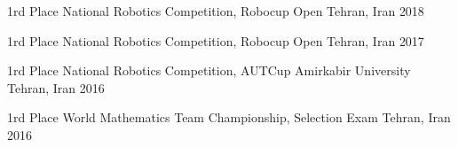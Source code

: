 \begin{cvhonors}





\cvhonor
{1rd Place} %
{National Robotics Competition, Robocup Open} %
{Tehran, Iran} %
{2018} %


\cvhonor
{1rd Place} %
{National Robotics Competition, Robocup Open} %
{Tehran, Iran} %
{2017} %


\cvhonor
{1rd Place} %
{National Robotics Competition, AUTCup Amirkabir University} %
{Tehran, Iran} %
{2016} %


\cvhonor
{1rd Place} %
{World Mathematics Team Championship, Selection Exam} %
{Tehran, Iran} %
{2016} %


\end{cvhonors}